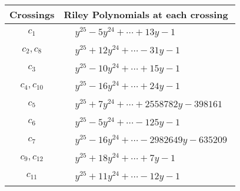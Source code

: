 \documentclass[1p]{elsarticle_modified}
\theoremstyle{definition}
\begin{document}
\begin{tabular}{m{50pt}|m{274pt}}
Crossings & \hspace{64pt}Riley Polynomials at each crossing \\
\hline $$\begin{aligned}c_{1}\end{aligned}$$&$\begin{aligned}
&y^{25}-5 y^{24}+\cdots+13 y-1
\end{aligned}$\\
\hline $$\begin{aligned}c_{2},c_{8}\end{aligned}$$&$\begin{aligned}
&y^{25}+12 y^{24}+\cdots-31 y-1
\end{aligned}$\\
\hline $$\begin{aligned}c_{3}\end{aligned}$$&$\begin{aligned}
&y^{25}-10 y^{24}+\cdots+15 y-1
\end{aligned}$\\
\hline $$\begin{aligned}c_{4},c_{10}\end{aligned}$$&$\begin{aligned}
&y^{25}-16 y^{24}+\cdots+24 y-1
\end{aligned}$\\
\hline $$\begin{aligned}c_{5}\end{aligned}$$&$\begin{aligned}
&y^{25}+7 y^{24}+\cdots+2558782 y-398161
\end{aligned}$\\
\hline $$\begin{aligned}c_{6}\end{aligned}$$&$\begin{aligned}
&y^{25}-5 y^{24}+\cdots-125 y-1
\end{aligned}$\\
\hline $$\begin{aligned}c_{7}\end{aligned}$$&$\begin{aligned}
&y^{25}-16 y^{24}+\cdots-2982649 y-635209
\end{aligned}$\\
\hline $$\begin{aligned}c_{9},c_{12}\end{aligned}$$&$\begin{aligned}
&y^{25}+18 y^{24}+\cdots+7 y-1
\end{aligned}$\\
\hline $$\begin{aligned}c_{11}\end{aligned}$$&$\begin{aligned}
&y^{25}+11 y^{24}+\cdots-12 y-1
\end{aligned}$\\
\hline
\end{tabular}\\~\\
\end{document}
